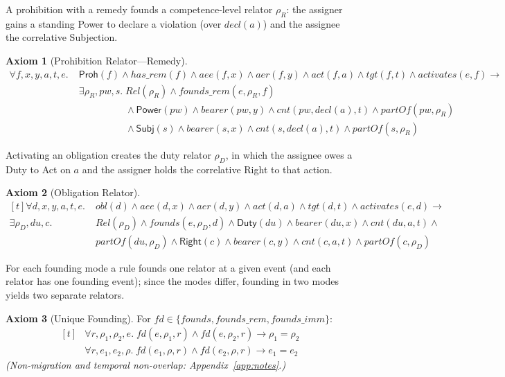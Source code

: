\documentclass{IOS-Book-Article}
\newcommand{\activates}{\mathit{activates}}
\newcommand{\founds}{\mathit{founds}}
\newcommand{\hasrem}{\mathit{has\_rem}}
\newcommand{\Duty}{\mathsf{Duty}}            %
\newcommand{\Right}{\mathsf{Right}}          %
\newcommand{\Power}{\mathsf{Power}}          %
\newcommand{\Subj}{\mathsf{Subj}}       %
\newcommand{\Proh}{\mathsf{Proh}}
\theoremstyle{definition}
\newtheorem{axiom}{Axiom}[section]
\begin{document}
\noindent A prohibition with a remedy founds a competence-level relator $\rho_R$: the assigner gains a standing Power to declare a violation (over
$\mathit{decl}(a)$) and the assignee the correlative Subjection.
\begin{axiom}[Prohibition Relator---Remedy]
\label{ax:proh-relator-remedy}
\begin{align*}
\forall f,x,y,a,t,e.\;
  &\Proh(f)\land\hasrem(f)\land\mathit{aee}(f,x)\land\mathit{aer}(f,y)\land
   \mathit{act}(f,a)\land\mathit{tgt}(f,t)\land\activates(e,f)\to \\
  &\exists\rho_R,pw,s.\;
   \mathit{Rel}(\rho_R)\land\mathit{founds\_rem}(e,\rho_R,f)\\
  &\phantom{\exists\rho_R,pw,s.\;}\land
   \Power(pw)\land\mathit{bearer}(pw,y)\land
   \mathit{cnt}(pw,\mathit{decl}(a),t)\land\mathit{partOf}(pw,\rho_R)\\
  &\phantom{\exists\rho_R,pw,s.\;}\land
   \Subj(s)\land\mathit{bearer}(s,x)\land
   \mathit{cnt}(s,\mathit{decl}(a),t)\land\mathit{partOf}(s,\rho_R)
\end{align*}
\end{axiom}
\noindent Activating an obligation creates the duty relator $\rho_D$, in which
the assignee owes a Duty to Act on $a$ and the assigner holds the correlative
Right to that action.
\begin{axiom}[Obligation Relator]
\label{ax:obl-relator}
\[
\begin{aligned}[t]
\forall d,x,y,a,t,e.\;&
\mathit{obl}(d)\land\mathit{aee}(d,x)\land\mathit{aer}(d,y)\land
\mathit{act}(d,a)\land\mathit{tgt}(d,t)\land\activates(e,d)\to\\
\exists\rho_D,du,c.\;&
\mathit{Rel}(\rho_D)\land\founds(e,\rho_D,d)\land
\Duty(du)\land\mathit{bearer}(du,x)\land\mathit{cnt}(du,a,t)\land\\
&\mathit{partOf}(du,\rho_D)\land
\Right(c)\land\mathit{bearer}(c,y)\land\mathit{cnt}(c,a,t)\land\mathit{partOf}(c,\rho_D)
\end{aligned}
\]
\end{axiom}
\noindent For each founding mode a rule founds one relator at a given event (and each relator has one founding event); since the modes differ, founding in
two modes yields two separate relators.
\begin{axiom}[Unique Founding]
\label{ax:unique-founding}
For $\mathit{fd}\in\{\founds,\mathit{founds\_rem},\mathit{founds\_imm}\}$:
\[
\begin{aligned}[t]
&\forall r,\rho_1,\rho_2,e.\;
\mathit{fd}(e,\rho_1,r)\land\mathit{fd}(e,\rho_2,r)\to\rho_1=\rho_2\\
&\forall r,e_1,e_2,\rho.\;
\mathit{fd}(e_1,\rho,r)\land\mathit{fd}(e_2,\rho,r)\to e_1=e_2
\end{aligned}
\]
\textit{(Non-migration and temporal non-overlap: Appendix~\ref{app:notes}.)}
\end{axiom}
\end{document}
